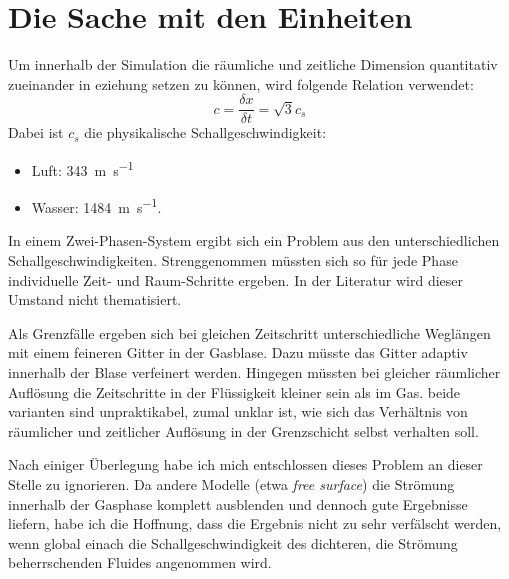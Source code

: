\documentclass[a4paper,10pt]{scrreprt}
\begin{document}
\section{Die Sache mit den Einheiten}
Um innerhalb der Simulation die räumliche und zeitliche Dimension quantitativ zueinander in eziehung setzen zu können, wird folgende Relation verwendet:
\begin{equation}
 c = \frac{\delta x}{\delta t} = \sqrt{3} c_s
\end{equation}
Dabei ist $c_s$ die physikalische Schallgeschwindigkeit:
\begin{itemize}
 \item Luft: \SI{343}{\metre \per \second}
 \item Wasser: \SI{1484}{\metre \per \second}.
\end{itemize}
In einem Zwei-Phasen-System ergibt sich ein Problem aus den unterschiedlichen Schallgeschwindigkeiten. 
Strenggenommen müssten sich so für jede Phase individuelle Zeit- und Raum-Schritte ergeben. 
In der Literatur wird dieser Umstand nicht thematisiert. 

Als Grenzfälle ergeben sich bei gleichen Zeitschritt unterschiedliche Weglängen mit einem feineren Gitter in der Gasblase. 
Dazu müsste das Gitter adaptiv innerhalb der Blase verfeinert werden. 
Hingegen müssten bei gleicher räumlicher Auflösung die Zeitschritte in der Flüssigkeit kleiner sein als im Gas. 
beide varianten sind unpraktikabel, zumal unklar ist, wie sich das Verhältnis von räumlicher und zeitlicher Auflösung in der Grenzschicht selbst verhalten soll.

Nach einiger Überlegung habe ich mich entschlossen dieses Problem an dieser Stelle zu ignorieren. 
Da andere Modelle (etwa \emph{free surface}) die Strömung innerhalb der Gasphase komplett ausblenden und dennoch gute Ergebnisse liefern, habe ich die Hoffnung, dass die Ergebnis nicht zu sehr verfälscht werden, wenn global einach die Schallgeschwindigkeit des dichteren, die Strömung beherrschenden Fluides angenommen wird.
\end{document}
